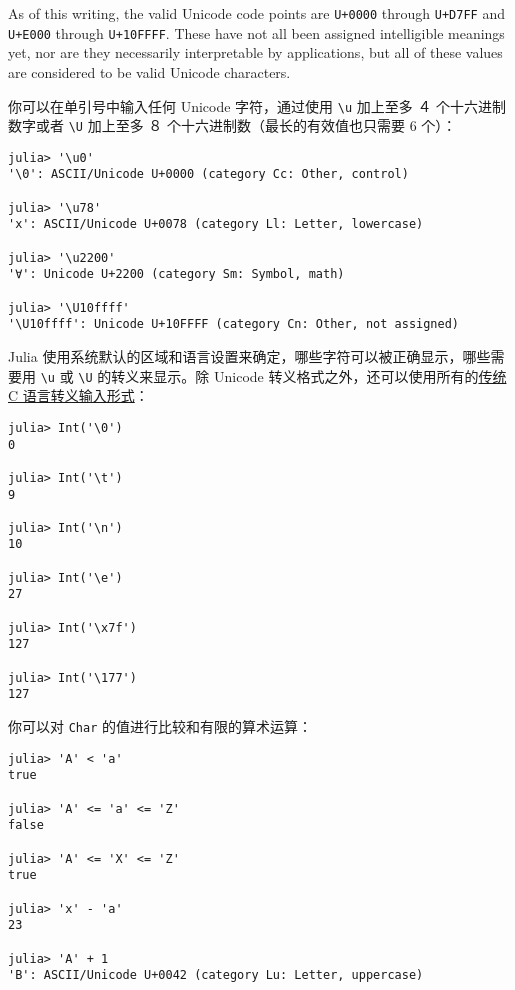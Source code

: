 As of this writing, the valid Unicode code points are \texttt{U+0000} through \texttt{U+D7FF} and \texttt{U+E000} through \texttt{U+10FFFF}. These have not all been assigned intelligible meanings yet, nor are they necessarily interpretable by applications, but all of these values are considered to be valid Unicode characters.



你可以在单引号中输入任何 Unicode 字符，通过使用 \texttt{{\textbackslash}u} 加上至多 ４ 个十六进制数字或者 \texttt{{\textbackslash}U} 加上至多 ８ 个十六进制数（最长的有效值也只需要 6 个）：




\begin{verbatim}
julia> '\u0'
'\0': ASCII/Unicode U+0000 (category Cc: Other, control)

julia> '\u78'
'x': ASCII/Unicode U+0078 (category Ll: Letter, lowercase)

julia> '\u2200'
'∀': Unicode U+2200 (category Sm: Symbol, math)

julia> '\U10ffff'
'\U10ffff': Unicode U+10FFFF (category Cn: Other, not assigned)
\end{verbatim}



Julia 使用系统默认的区域和语言设置来确定，哪些字符可以被正确显示，哪些需要用 \texttt{{\textbackslash}u} 或 \texttt{{\textbackslash}U} 的转义来显示。除 Unicode 转义格式之外，还可以使用所有的\href{https://en.wikipedia.org/wiki/C\_syntax\#Backslash\_escapes}{传统 C 语言转义输入形式}：




\begin{verbatim}
julia> Int('\0')
0

julia> Int('\t')
9

julia> Int('\n')
10

julia> Int('\e')
27

julia> Int('\x7f')
127

julia> Int('\177')
127
\end{verbatim}



你可以对 \texttt{Char} 的值进行比较和有限的算术运算：




\begin{verbatim}
julia> 'A' < 'a'
true

julia> 'A' <= 'a' <= 'Z'
false

julia> 'A' <= 'X' <= 'Z'
true

julia> 'x' - 'a'
23

julia> 'A' + 1
'B': ASCII/Unicode U+0042 (category Lu: Letter, uppercase)
\end{verbatim}



